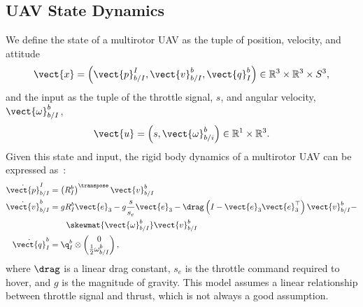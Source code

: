 
\subsection{UAV State Dynamics}
We define the state of a multirotor UAV as the tuple of position, velocity, and
attitude
\begin{equation*}
  \vect{x} = \begin{pmatrix}\vect{p}_{b/I}^{I}, \vect{v}_{b/I}^b, \vect{q}_I^{b}
        \end{pmatrix} \in \mathbb{R}^3 \times \mathbb{R}^3
        \times S^3,
\end{equation*}
and the input as the tuple of the throttle signal, $s$, and angular
velocity, $\vect{\omega}_{b/I}^b$,
\begin{equation*}
	\vect{u} = \begin{pmatrix}s, \vect{\omega}_{b/i}^b \end{pmatrix} \in
        \mathbb{R}^1 \times \mathbb{R}^3.
\end{equation*}
Given this state and input, the rigid body dynamics of a multirotor UAV can be
expressed as~\cite{leishman2014accel}:
\begin{align}
		\dot{\vect{p}}_{b/I}^{I} &= \left(R_{I}^{b}\right)^\transpose \vect{v}_{b/I}^{b} \nonumber \\
		\dot{\vect{v}}_{b/I}^{b} &= gR_I^b \vect{e}_3 - g\frac{s}{s_e}\vect{e}_3 -
                \drag \left( I - \vect{e}_3 \vect{e}_3^\top \right)
                \vect{v}_{b/I}^b - \nonumber \\
                \label{eq:dynamics}
                & \qquad \skewmat{\vect{\omega}_{b/I}^b}\vect{v}_{b/I}^b \\
                \dot{\vect{q}}_{I}^{b} 
	&= 	
                \q_I^b \otimes \begin{pmatrix} 0 \\ \frac{1}{2}
                \omega_{b/I}^b\end{pmatrix} \nonumber,
\end{align}
where $\drag$ is a linear drag constant, $s_e$ is the throttle command required
to hover, and $g$ is the magnitude of gravity.  This model assumes a linear
relationship between throttle signal and thrust, which is not always a good
assumption.

